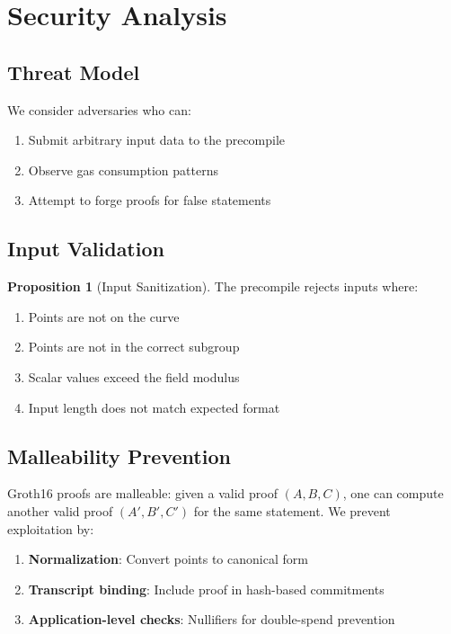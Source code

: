 \documentclass[11pt,a4paper]{article}
\theoremstyle{definition}
\newtheorem{proposition}{Proposition}
\begin{document}
\section{Security Analysis}

\subsection{Threat Model}

We consider adversaries who can:
\begin{enumerate}
    \item Submit arbitrary input data to the precompile
    \item Observe gas consumption patterns
    \item Attempt to forge proofs for false statements
\end{enumerate}

\subsection{Input Validation}

\begin{proposition}[Input Sanitization]
    The precompile rejects inputs where:
    \begin{enumerate}
        \item Points are not on the curve
        \item Points are not in the correct subgroup
        \item Scalar values exceed the field modulus
        \item Input length does not match expected format
    \end{enumerate}
\end{proposition}

\subsection{Malleability Prevention}

Groth16 proofs are malleable: given a valid proof $(A, B, C)$, one can compute another valid proof $(A', B', C')$ for the same statement. We prevent exploitation by:

\begin{enumerate}
    \item \textbf{Normalization}: Convert points to canonical form
    \item \textbf{Transcript binding}: Include proof in hash-based commitments
    \item \textbf{Application-level checks}: Nullifiers for double-spend prevention
\end{enumerate}
\end{document}
